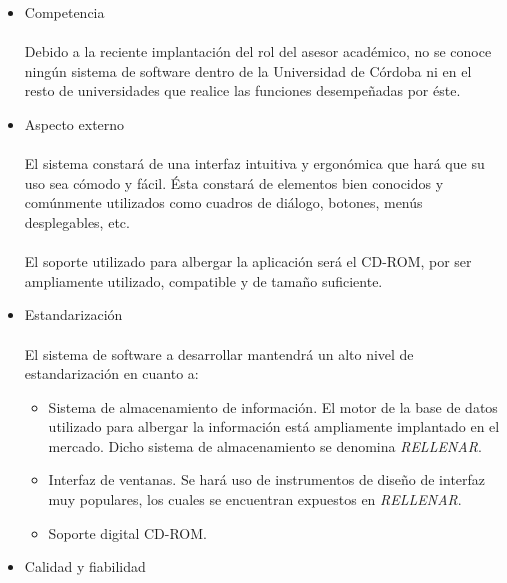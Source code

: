 \begin{itemize}
 \item Competencia

   \paragraph{}Debido a la reciente implantación del rol del asesor académico,
   no se conoce ningún sistema de software dentro de la Universidad de Córdoba
   ni en el resto de universidades que realice las funciones desempeñadas por
   éste.

 \item Aspecto externo

   \paragraph{}El sistema constará de una interfaz intuitiva y ergonómica que
   hará que su uso sea cómodo y fácil. Ésta constará de elementos bien conocidos
   y comúnmente utilizados como cuadros de diálogo, botones, menús desplegables,
   etc.

   \paragraph{}El soporte utilizado para albergar la aplicación será el CD-ROM,
   por ser ampliamente utilizado, compatible y de tamaño suficiente.

 \item Estandarización

   \paragraph{}El sistema de software a desarrollar mantendrá un alto nivel de
   estandarización en cuanto a:

   \begin{itemize}
      \item Sistema de almacenamiento de información. El motor de la base de
      datos utilizado para albergar la información está ampliamente implantado
      en el mercado. Dicho sistema de almacenamiento se denomina
      \textit{RELLENAR}.
      \item Interfaz de ventanas. Se hará uso de instrumentos de diseño de
      interfaz muy populares, los cuales se encuentran expuestos en
      \textit{RELLENAR}.
      \item Soporte digital CD-ROM.
   \end{itemize}


 \item Calidad y fiabilidad


\end{itemize}
